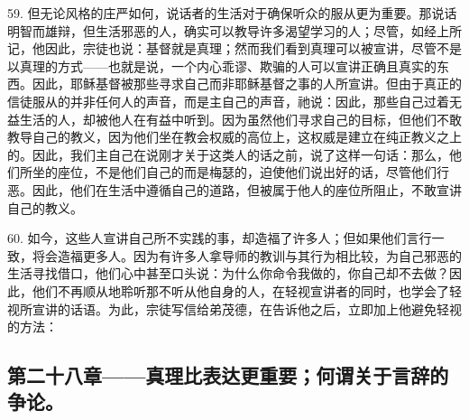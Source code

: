 59. 但无论风格的庄严如何，说话者的生活对于确保听众的服从更为重要。那说话明智而雄辩，但生活邪恶的人，确实可以教导许多渴望学习的人；尽管，如经上所记，他因此，宗徒也说：基督就是真理；然而我们看到真理可以被宣讲，尽管不是以真理的方式——也就是说，一个内心乖谬、欺骗的人可以宣讲正确且真实的东西。因此，耶稣基督被那些寻求自己而非耶稣基督之事的人所宣讲。但由于真正的信徒服从的并非任何人的声音，而是主自己的声音，祂说：因此，那些自己过着无益生活的人，却被他人在有益中听到。因为虽然他们寻求自己的目标，但他们不敢教导自己的教义，因为他们坐在教会权威的高位上，这权威是建立在纯正教义之上的。因此，我们主自己在说刚才关于这类人的话之前，说了这样一句话：那么，他们所坐的座位，不是他们自己的而是梅瑟的，迫使他们说出好的话，尽管他们行恶。因此，他们在生活中遵循自己的道路，但被属于他人的座位所阻止，不敢宣讲自己的教义。\par

60. 如今，这些人宣讲自己所不实践的事，却造福了许多人；但如果他们言行一致，将会造福更多人。因为有许多人拿导师的教训与其行为相比较，为自己邪恶的生活寻找借口，他们心中甚至口头说：为什么你命令我做的，你自己却不去做？因此，他们不再顺从地聆听那不听从他自身的人，在轻视宣讲者的同时，也学会了轻视所宣讲的话语。为此，宗徒写信给弟茂德，在告诉他之后，立即加上他避免轻视的方法： \par


\subsection{第二十八章——真理比表达更重要；何谓关于言辞的争论。}

